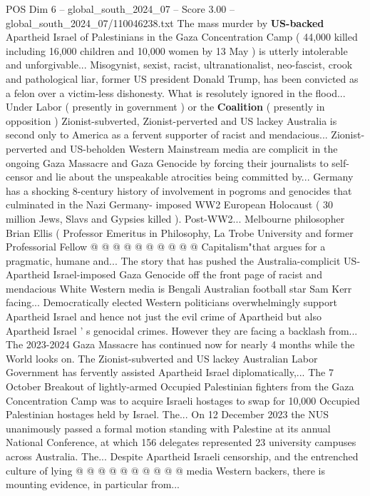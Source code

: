 \begin{textsample}{POS Dim 6 – global\_south\_2024\_07 – Score 3.00 – global\_south\_2024\_07/110046238.txt}  \label{ex:f6_pos_338}
The mass murder by \textbf{US-backed} Apartheid Israel of Palestinians in the Gaza Concentration Camp ( 44,000 killed including 16,000 children and 10,000 women by 13 May ) is utterly intolerable and unforgivable...
Misogynist, sexist, racist, ultranationalist, neo-fascist, crook and pathological liar, former US president Donald Trump, has been convicted as a felon over a victim-less dishonesty.
What is resolutely ignored in the flood...
Under Labor ( presently in government ) or the \textbf{Coalition} ( presently in opposition ) Zionist-subverted, Zionist-perverted and US lackey Australia is second only to America as a fervent supporter of racist and mendacious...
Zionist-perverted and US-beholden Western Mainstream media are complicit in the ongoing Gaza Massacre and Gaza Genocide by forcing their journalists to self-censor and lie about the unspeakable atrocities being committed by...
Germany has a shocking 8-century history of involvement in pogroms and genocides that culminated in the Nazi Germany- imposed WW2 European Holocaust ( 30 million Jews, Slavs and Gypsies killed ).
Post-WW2...
Melbourne philosopher Brian Ellis ( Professor Emeritus in Philosophy, La Trobe University and former Professorial Fellow @ @ @ @ @ @ @ @ @ @ Capitalism"that argues for a pragmatic, humane and...
The story that has pushed the Australia-complicit US-Apartheid Israel-imposed Gaza Genocide off the front page of racist and mendacious White Western media is Bengali Australian football star Sam Kerr facing...
Democratically elected Western politicians overwhelmingly support Apartheid Israel and hence not just the evil crime of Apartheid but also Apartheid Israel ' s genocidal crimes.
However they are facing a backlash from...
The 2023-2024 Gaza Massacre has continued now for nearly 4 months while the World looks on.
The Zionist-subverted and US lackey Australian Labor Government has fervently assisted Apartheid Israel diplomatically,...
The 7 October Breakout of lightly-armed Occupied Palestinian fighters from the Gaza Concentration Camp was to acquire Israeli hostages to swap for 10,000 Occupied Palestinian hostages held by Israel.
The...
On 12 December 2023 the NUS unanimously passed a formal motion standing with Palestine at its annual National Conference, at which 156 delegates represented 23 university campuses across Australia.
The...
Despite Apartheid Israeli censorship, and the entrenched culture of lying @ @ @ @ @ @ @ @ @ @ media Western backers, there is mounting evidence, in particular from...

\end{textsample}
